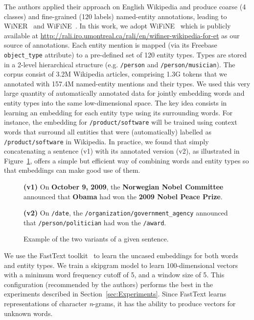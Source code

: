 \documentclass[11pt]{article}
\newcommand{\winer}{WiNER}
\newcommand{\wifine}{WiFiNE}
\begin{document}
	The authors applied their approach on English Wikipedia and produce coarse (4 classes) and fine-grained (120 labels) named-entity annotations, leading to \winer~\cite{ghaddar2017winer} and \wifine~\cite{ghaddara2018wifine}. In this work, we adopt \wifine{ } which is publicly available at \url{http://rali.iro.umontreal.ca/rali/en/wifiner-wikipedia-for-et} as our source of annotations. Each entity mention is mapped (via its Freebase \texttt{object\_type} attribute) to a pre-defined set of 120 entity types. Types are stored in a 2-level hierarchical structure (e.g. \texttt{/person} and \texttt{/person/musician}). The corpus consist of 3.2M Wikipedia articles, comprising 1.3G  tokens that we annotated with 157.4M named-entity mentions and their types.
	We used this very large quantity of automatically annotated data for jointly embedding words and entity types into the same low-dimensional space.  The key idea consists in learning an embedding for each entity type using its surrounding words. For instance, the embedding for \texttt{/product/software} will be trained using context words that surround all entities that were (automatically) labelled as \texttt{/product/software} in Wikipedia. In practice, we found that simply concatenating a sentence (v1) with its annotated version (v2),  as illustrated in Figure~\ref{fig:corpus}, offers a simple but efficient way of combining words and entity types so that embeddings can make good use of them.
	
	\begin{figure}[!h]
		
		\begin{framed}
			\textbf{(v1)} On \textbf{October 9, 2009}, the \textbf{Norwegian Nobel Committee} announced that \textbf{Obama} had won the \textbf{2009 Nobel Peace Prize}.
			
			\textbf{(v2)} On \texttt{/date}, the \texttt{/organization/government\_agency} announced that \texttt{/person/politician} had won the \texttt{/award}.
		\end{framed}
		
		\caption{Example of the two variants of a given sentence.}
		\label{fig:corpus}
	\end{figure}
	
	
	
	
	
	We use the FastText toolkit~\cite{bojanowski2016enriching} to learn the uncased embeddings for both words and entity types. We train a skipgram model to learn 100-dimensional vectors with a minimum word frequency cutoff of 5, and a window size of 5. This configuration (recommended by the authors) performs the best in the experiments described in Section~\ref{sec:Experiments}. Since FastText learns representations of character \textit{n}-grams, it has the ability to produce vectors for unknown words. 
\end{document}
